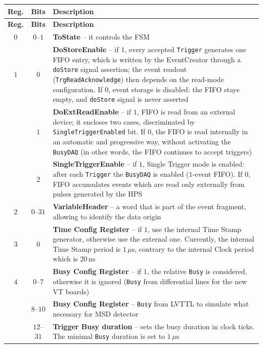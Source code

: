 {\footnotesize%
	\begin{longtable}[H]{|c|c|p{11.5cm}|}
		\hline
		\textbf{Reg.} & \textbf{Bits} & \textbf{Description} \\
		\hline
		\endfirsthead
		\hline
		\textbf{Reg.} & \textbf{Bits} & \textbf{Description} \\
		\hline
		\endhead
		$0$ & $0$--$1$ & \textbf{ToState} -- it controls the FSM \\
		\hline
		$1$ & $0$ & \textbf{DoStoreEnable} -- if $1$, every accepted \texttt{Trigger} generates one FIFO entry, which is written by the EventCreator through a \texttt{doStore} signal assertion; the event readout (\texttt{TrgReadAcknowledge}) then depends on the read-mode configuration. If $0$, event storage is disabled: the FIFO stays empty, and \texttt{doStore} signal is never asserted \\
		& $1$ & \textbf{DoExtReadEnable} -- if $1$, FIFO is read from an external device; it encloses two cases, discriminated by \texttt{SingleTriggerEnabled} bit. If $0$, the FIFO is read internally in an automatic and progressive way, without activating the \texttt{BusyDAQ} (in other words, the FIFO continues to accept triggers) \\
		& $2$ & \textbf{SingleTriggerEnable} -- if $1$, Single Trigger mode is enabled: after each \texttt{Trigger} the \texttt{BusyDAQ} is enabled ($1$-event FIFO). If $0$, FIFO accumulates events which are read only externally from pulses generated by the HPS \\
		\hline
		$2$ & $0$--$31$ & \textbf{VariableHeader} -- a word that is part of the event fragment, allowing to identify the data origin \\
		\hline
		$3$ & $0$ & \textbf{Time Config Register} -- if $1$, use the internal Time Stamp generator, otherwise use the external one. Currently, the internal Time Stamp period is $1\,\mu\mathrm{s}$, contrary to the internal Clock period which is $20\,\mathrm{ns}$ \\
		\hline
		$4$ & $0$--$7$ & \textbf{Busy Config Register} -- if $1$, the relative \texttt{Busy} is considered, otherwise it is ignored (\texttt{Busy} from differential lines for the new VT boards) \\
		& $8$--$10$ & \textbf{Busy Config Register} -- \texttt{Busy} from LVTTL to simulate what necessary for MSD detector \\
		& $12$--$31$ & \textbf{Trigger Busy duration} -- sets the busy duration in clock ticks. The minimal \texttt{Busy} duration is set to $1\,\mu\mathrm{s}$\\

\end{longtable}}

